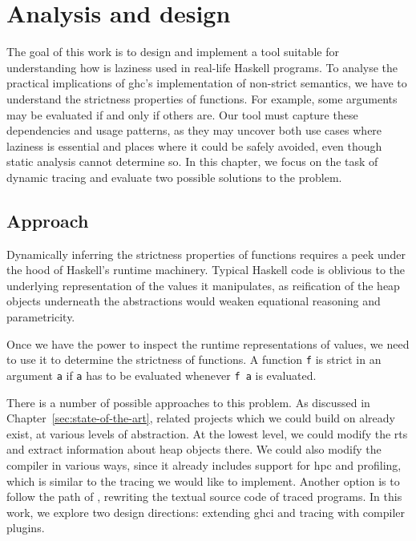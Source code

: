 \documentclass[thesis=B,english]{FITthesis}[2019/12/23]
\newcommand{\hsIdent}[1]{\texttt{#1}}
\newcommand{\hsCode}[1]{\texttt{#1}}
\begin{document}
\chapter{Analysis and design} \label{sec:analysis-design}

The goal of this work is to design and implement a tool suitable for
understanding how is laziness used in real-life Haskell programs. To analyse
the practical implications of \acrshort{ghc}'s implementation of non-strict
semantics, we have to understand the strictness properties of functions. For
example, some arguments may be evaluated if and only if others are. Our tool
must capture these dependencies and usage patterns, as they may uncover both
use cases where laziness is essential and places where it could be safely
avoided, even though static analysis cannot determine so. In this chapter, we
focus on the task of dynamic tracing and evaluate two possible solutions to the
problem.

\section{Approach} \label{sec:approach}

Dynamically inferring the strictness properties of functions requires a peek
under the hood of Haskell's runtime machinery. Typical Haskell code is
oblivious to the underlying representation of the values it manipulates, as
reification of the heap objects underneath the abstractions would weaken
equational reasoning and parametricity.

Once we have the power to inspect the runtime representations of values, we
need to use it to determine the strictness of functions. A function \hsIdent{f}
is strict in an argument \hsIdent{a} if \hsIdent{a} has to be evaluated
whenever \hsCode{f a} is evaluated.

There is a number of possible approaches to this problem. As discussed in
Chapter~\ref{sec:state-of-the-art}, related projects which we could build on
already exist, at various levels of abstraction. At the lowest level, we could
modify the \acrshort{rts} and extract information about heap objects there. We
could also modify the compiler in various ways, since it already includes
support for \acrshort{hpc} and profiling, which is similar to the tracing we
would like to implement. Another option is to follow the path of
, rewriting the textual source code of traced programs. In
this work, we explore two design directions: extending \acrshort{ghci} and
tracing with compiler plugins.
\end{document}
